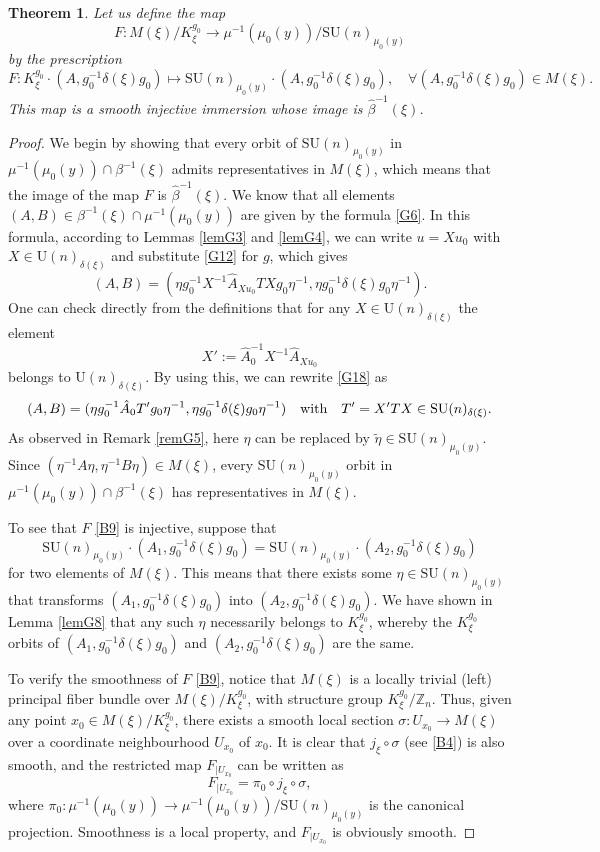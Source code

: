 \documentclass[a4paper,11pt,reqno]{amsart}
\newtheorem{thm}{Theorem}[section]
\theoremstyle{definition}
\numberwithin{equation}{section}
\newcommand{\be}{\begin{equation}}
\newcommand{\ee}{\end{equation}}
\def\bZ{{\mathbb Z}}                        %
\def\SU{\mathrm{SU}}                        %
\def\U{\mathrm{U}}                          %
\begin{document}
\begin{thm}\label{thm313}
Let us define the map
\be
F: M(\xi)/K_\xi^{g_0} \to  \mu^{-1}(\mu_0(y))/\SU(n)_{\mu_0(y)}
\label{B8}\ee
by the prescription
\be
F: K_\xi^{g_0} \cdot (A,g_0^{-1} \delta(\xi) g_0) \mapsto \SU(n)_{\mu_0(y)} \cdot (A,g_0^{-1}\delta(\xi) g_0),
\quad \forall (A,g_0^{-1} \delta(\xi) g_0)\in M(\xi).
\label{B9}\ee
This map is a smooth injective immersion whose image is $\hat \beta^{-1}(\xi)$.
\end{thm}
\begin{proof}
We begin by showing that every orbit of $\SU(n)_{\mu_0(y)}$ in $\mu^{-1}(\mu_0(y)) \cap \beta^{-1}(\xi)$ admits representatives
in $M(\xi)$, which means that the image of the map $F$ is $\hat \beta^{-1}(\xi)$.
We know that all elements  $(A,B)\in \beta^{-1}(\xi) \cap \mu^{-1}(\mu_0(y))$ are given by the formula
\eqref{G6}.
In this formula, according to Lemmas \ref{lemG3} and \ref{lemG4}, we can write
$u = X u_0$ with $X\in \U(n)_{\delta(\xi)}$ and substitute \eqref{G12} for $g$, which  gives
\be
(A,B) = (\eta g_0^{-1} X^{-1} \hat A_{Xu_0} T X g_0 \eta^{-1}, \eta g_0^{-1} \delta(\xi) g_0 \eta^{-1}).
\label{G18}\ee
One can check directly from the definitions that for any $X\in \U(n)_{\delta(\xi)}$ the element
\be
X':= \hat A_0^{-1}  X^{-1} \hat A_{Xu_0}
\ee
belongs to $\U(n)_{\delta(\xi)}$.
By using this, we can rewrite \eqref{G18} as
\be
(A,B) = (\eta g_0^{-1} \hat A_0 T' g_0 \eta^{-1},  \eta g_0^{-1} \delta(\xi) g_0 \eta^{-1})
\quad\hbox{with}\quad
T'= X' T X \in \SU(n)_{\delta(\xi)}.
\ee
As observed in  Remark \ref{remG5}, here $\eta$ can be replaced by $\tilde \eta \in \SU(n)_{\mu_0(y)}$.
Since $(\eta^{-1} A \eta, \eta^{-1} B \eta) \in M(\xi)$,
every $\SU(n)_{\mu_0(y)}$ orbit in $\mu^{-1}(\mu_0(y))\cap \beta^{-1}(\xi)$  has representatives  in $M(\xi)$.


To see that $F$ \eqref{B9} is injective, suppose that
\be
\SU(n)_{\mu_0(y)} \cdot (A_1,   g_0^{-1}\delta(\xi) g_0)= \SU(n)_{\mu_0(y)} \cdot (A_2,   g_0^{-1}\delta(\xi) g_0)
\label{B10}\ee
for two elements of $M(\xi)$. This means that there exists some $\eta \in \SU(n)_{\mu_0(y)}$ that transforms
$(A_1,   g_0^{-1}\delta(\xi) g_0)$ into $(A_2,   g_0^{-1}\delta(\xi) g_0)$. We have shown in Lemma \ref{lemG8}  that any such $\eta$ necessarily
belongs to $K_\xi^{g_0}$, whereby the $K_\xi^{g_0}$ orbits of $(A_1,   g_0^{-1}\delta(\xi) g_0)$ and $(A_2,   g_0^{-1}\delta(\xi) g_0)$ are the same.

To verify the smoothness of $F$ \eqref{B9}, notice that $M(\xi)$ is a locally trivial (left) principal fiber bundle
over $M(\xi)/K_\xi^{g_0}$, with structure group $K_\xi^{g_0}/\bZ_n$.
Thus, given any point $x_0 \in M(\xi)/K_\xi^{g_0}$, there exists a smooth local section
$\sigma: U_{x_0} \to M(\xi)$ over a coordinate neighbourhood  $U_{x_0}$ of $x_0$.
It is clear that $j_\xi \circ \sigma$ (see \eqref{B4}) is also smooth, and
the restricted map $F_{\vert U_{x_0}}$  can be written as
\be
F_{\vert U_{x_0}} = \pi_0 \circ j_\xi \circ \sigma,
\label{B11}\ee
where $\pi_0: \mu^{-1}(\mu_0(y)) \to \mu^{-1}(\mu_0(y))/\SU(n)_{\mu_0(y)}$ is the canonical projection.
Smoothness is a local property, and
$F_{\vert U_{x_0}}$ is obviously smooth.


\end{proof}
\end{document}
